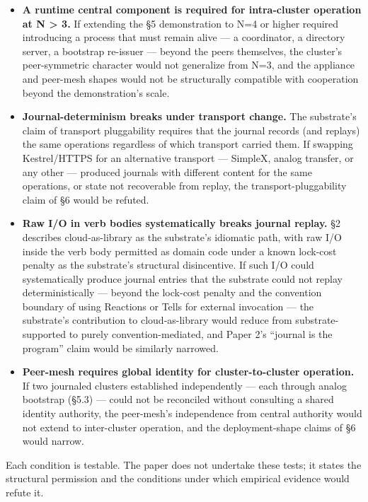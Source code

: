 \documentclass[
]{article}
\begin{document}
\begin{itemize}
\item
  \textbf{A runtime central component is required for intra-cluster
  operation at N \textgreater{} 3.} If extending the §5 demonstration to
  N=4 or higher required introducing a process that must remain alive
  --- a coordinator, a directory server, a bootstrap re-issuer ---
  beyond the peers themselves, the cluster's peer-symmetric character
  would not generalize from N=3, and the appliance and peer-mesh shapes
  would not be structurally compatible with cooperation beyond the
  demonstration's scale.
\item
  \textbf{Journal-determinism breaks under transport change.} The
  substrate's claim of transport pluggability requires that the journal
  records (and replays) the same operations regardless of which
  transport carried them. If swapping Kestrel/HTTPS for an alternative
  transport --- SimpleX, analog transfer, or any other --- produced
  journals with different content for the same operations, or state not
  recoverable from replay, the transport-pluggability claim of §6 would
  be refuted.
\item
  \textbf{Raw I/O in verb bodies systematically breaks journal replay.}
  §2 describes cloud-as-library as the substrate's idiomatic path, with
  raw I/O inside the verb body permitted as domain code under a known
  lock-cost penalty as the substrate's structural disincentive. If such
  I/O could systematically produce journal entries that the substrate
  could not replay deterministically --- beyond the lock-cost penalty
  and the convention boundary of using Reactions or Tells for external
  invocation --- the substrate's contribution to cloud-as-library would
  reduce from substrate-supported to purely convention-mediated, and
  Paper 2's ``journal is the program'' claim would be similarly
  narrowed.
\item
  \textbf{Peer-mesh requires global identity for cluster-to-cluster
  operation.} If two journaled clusters established independently ---
  each through analog bootstrap (§5.3) --- could not be reconciled
  without consulting a shared identity authority, the peer-mesh's
  independence from central authority would not extend to inter-cluster
  operation, and the deployment-shape claims of §6 would narrow.
\end{itemize}

Each condition is testable. The paper does not undertake these tests; it
states the structural permission and the conditions under which
empirical evidence would refute it.
\end{document}
